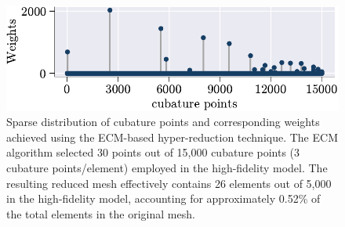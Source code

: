 \documentclass[11pt]{article}
\begin{document}
            \begin{figure}[t]
                    \centering
                    \includegraphics[width=0.8\linewidth]{reduced_mesh_empCM.pdf}
                    \caption{Sparse distribution of cubature points and corresponding weights achieved using the ECM-based hyper-reduction technique. The ECM algorithm selected 30 points out of 15,000 cubature points (3 cubature points/element) employed in the high-fidelity model. The resulting reduced mesh effectively contains 26 elements out of 5,000 in the high-fidelity model, accounting for approximately 0.52\% of the total elements in the original mesh.}
                    \label{fig:reduced_mesh_ecm}
            \end{figure}
\end{document}
